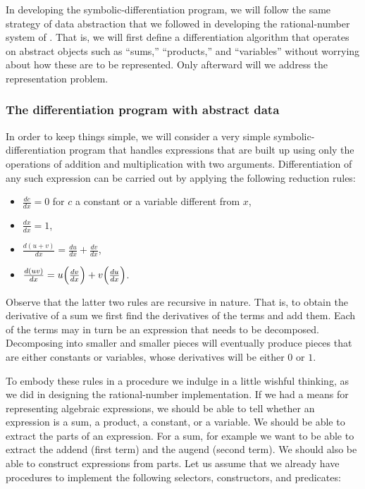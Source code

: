 In developing the symbolic-differentiation program, we will follow the same strategy of data abstraction that we followed in developing the rational-number system of .
That is, we will first define a differentiation algorithm that operates on abstract objects such as “sums,” “products,” and “variables” without worrying about how these are to be represented.
Only afterward will we address the representation problem.



\subsubsection*{The differentiation program with abstract data}

In order to keep things simple, we will consider a very simple symbolic-differentiation program that handles expressions that are built up using only the operations of addition and multiplication with two arguments.
Differentiation of any such expression can be carried out by applying the following reduction rules:
\begin{itemize}

	\item
		\( \frac{dc}{dx} = 0 \) for \( c \) a constant or a variable different from \( x \),

	\item
		\( \frac{dx}{dx} = 1 \),

	\item
		\( \frac{d(u + v)}{dx} = \frac{du}{dx} + \frac{dv}{dx} \),

	\item
		\( \frac{d(uv)}{dx} = u \Bigl( \frac{dv}{dx} \Bigr) + v \Bigl( \frac{du}{dx} \Bigr) \).
\end{itemize}

Observe that the latter two rules are recursive in nature.
That is, to obtain the derivative of a sum we first find the derivatives of the terms and add them.
Each of the terms may in turn be an expression that needs to be decomposed.
Decomposing into smaller and smaller pieces will eventually produce pieces that are either constants or variables, whose derivatives will be either \( 0 \) or \( 1 \).

To embody these rules in a procedure we indulge in a little wishful thinking, as we did in designing the rational-number implementation.
If we had a means for representing algebraic expressions, we should be able to tell whether an expression is a sum, a product, a constant, or a variable.
We should be able to extract the parts of an expression.
For a sum, for example we want to be able to extract the addend (first term) and the augend (second term).
We should also be able to construct expressions from parts.
Let us assume that we already have procedures to implement the following selectors, constructors, and predicates:

